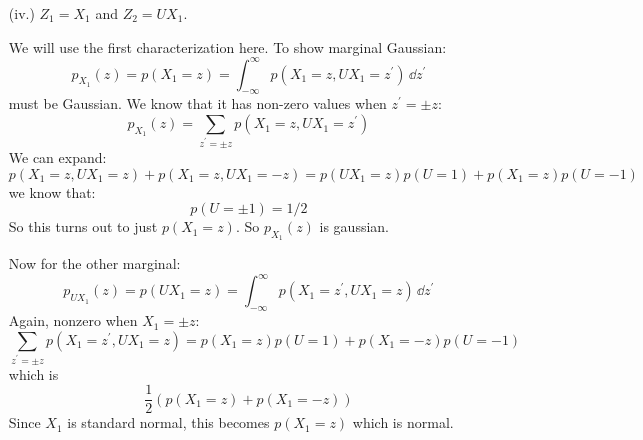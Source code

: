 \documentclass{article}
\begin{document}
\begin{itemize}
\begin{itemize}
                \item [(iv.)] $Z_{1} = X_{1}$ and $Z_{2} = UX_{1}$.
                    \begin{answer}
                        We will use the first characterization here. To show marginal Gaussian:
                            \begin{equation*}
                            p_{X_{1}}(z) = p(X_{1} = z) = \int_{-\infty}^{\infty} p(X_{1} = z, UX_{1} = z^{\prime}) \, \dd{z^{\prime}}
                            \end{equation*}
                        must be Gaussian. We know that it has non-zero values when $z^{\prime} = \pm z$:
                            \begin{equation*}
                                p_{X_{1}}(z) = \sum_{z^{\prime} = \pm z} p(X_{1} = z, UX_{1} = z^{\prime})
                            \end{equation*}
                        We can expand:
                            \begin{equation*}
                                p(X_{1} = z, UX_{1} = z) + p(X_{1} = z, UX_{1} = -z) = p(UX_{1} = z)p(U = 1) + p(X_{1} = z) p(U = -1)
                            \end{equation*}
                        we know that:
                            \begin{equation*}
                                p(U = \pm 1) = 1 / 2
                            \end{equation*}
                        So this turns out to just $p(X_{1} = z)$. So $p_{X_{1}}(z)$ is gaussian.

                        Now for the other marginal:
                            \begin{equation*}
                                p_{UX_{1}}(z) = p(UX_{1} = z) = \int_{-\infty}^{\infty} p(X_{1} = z^{\prime}, UX_{1} = z) \, \dd{z^{\prime}}
                            \end{equation*}
                        Again, nonzero when $X_{1} = \pm z$:
                            \begin{equation*}
                                \sum_{z^{\prime} = \pm z} p(X_{1} = z^{\prime}, UX_{1} = z) = p(X_{1} = z)p(U = 1) + p(X_{1} = -z)p(U = -1)
                            \end{equation*}
                        which is
                            \begin{equation*}
                                 \dfrac{1}{2}(p(X_{1} = z) + p(X_{1} = -z))
                            \end{equation*}
                        Since $X_{1}$ is standard normal, this becomes $p(X_{1} = z)$ which is normal.


\end{answer}
\end{itemize}
\end{itemize}
\end{document}
